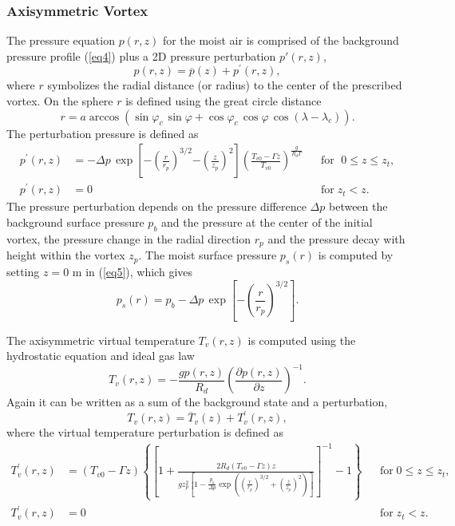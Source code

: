 \documentclass[times,doublespace]{fldauth}
\begin{document}
\subsubsection{Axisymmetric Vortex}

The pressure equation $p(r,z)$ for the moist air is comprised of the background pressure profile (\ref{eq4}) plus a 2D pressure perturbation $p'(r,z)$,
\begin{equation} \label{eq5}
p(r,z) = \overline{p}(z) + p^\prime(r,z),
\end{equation} where $r$ symbolizes the radial distance (or radius) to the center of the prescribed vortex.  On the sphere $r$ is defined using the great circle distance
\begin{equation}
r = a \arccos{ \left ( \sin{\varphi_c} \, \sin{\varphi} + \cos{\varphi_c} \, \cos{\varphi} \, \cos{(\lambda - \lambda_c)} \right )}.
\end{equation}  The perturbation pressure is defined as
\begin{align} \label{test5:p_pert}
p^\prime(r,z) & = -\Delta p \, \exp\left[{-\left (\frac{r}{r_p} \right ) ^{3/2}} {-\left (\frac{z}{z_p} \right ) ^{2}}\right] \left ( \frac{T_{v0} - \Gamma z}{T_{v0}} \right )^{\frac{g}{R_d \Gamma}} & & \mbox{for $\; 0 \le z \le z_t$},  \nonumber \\
p^\prime(r,z) & = 0 & & \mbox{for} \; z_t < z.
\end{align}  The pressure perturbation depends on the pressure difference $\Delta p$ between the background surface pressure $p_b$ and the pressure at the center of the initial vortex, the pressure change in the radial direction $r_p$ and the pressure decay with height within the vortex $z_p$.  The moist surface pressure $p_s(r)$ is computed by setting $z = 0$ m in (\ref{eq5}), which gives
\begin{equation}
\label{eq:ps}
p_s(r) = p_b - \Delta p \, \exp\left[{-\left (\frac{r}{r_p} \right ) ^{3/2}}\right].
\end{equation}

The axisymmetric virtual temperature $T_v(r,z)$ is computed using the hydrostatic equation and ideal gas law
\begin{equation}
T_v(r,z) = -\frac{g p(r,z)}{R_d} \left( \frac{\partial p(r,z)}{ \partial z} \right)^{-1}.
\end{equation}  Again it can be written as a sum of the background state and a perturbation,
\begin{equation} \label{eq:virt_temp}
T_v(r,z) = \overline{T}_v(z) + T_v^\prime(r,z),
\end{equation} where the virtual temperature perturbation is defined as
\begin{align}
\label{eq:Tv}
T_v^\prime(r,z) &= (T_{v0} - \Gamma z ) \left\{ \left [1+ \frac{2R_d(T_{v0} - \Gamma z)z}{gz_p^2 \left[ 1 - \frac{p_b}{\Delta p}\exp\left({\left (\frac{r}{r_p} \right ) ^{3/2}} + {\left (\frac{z}{z_p} \right ) ^{2}} \right) \right] }\right]^{-1} - 1 \right\} & & \mbox{for} \; 0 \le z \le z_t, \nonumber \\
T_v^\prime(r,z) &= 0 & & \mbox{for} \; z_t < z.
\end{align} 
\end{document}
